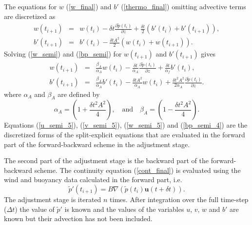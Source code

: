 \documentclass[times]{qjrms4}
\begin{document}
The equations for $w$ (\ref{w_final}) and $b'$ (\ref{thermo_final}) omitting advective terms are 
discretized as
\begin{eqnarray} 
w(t_{i+1}) &=& w(t_i) - \delta t \frac{\partial \tilde{p}(t_i)}{\partial z} + 
\frac {\delta t }{2} \left( b'(t_i) + b'(t_{i+1}) \right),\label{w_semi} \\
b'(t_{i+1}) &=& b'(t_i) - \frac {\delta t A^2 }{2} \left( w(t_i) + w(t_{i+1}) \right).
\label{bp_semi}
\end{eqnarray}
Solving (\ref{w_semi}) and (\ref{bp_semi}) for $w(t_{i+1})$ and $b'(t_{i+1})$ gives
  \begin{eqnarray} 
    w(t_{i+1}) &=& \frac{\beta_A}{\alpha_A} w(t_i) - \frac {\delta t }{\alpha_A} 
    \frac{\partial \tilde{p}(t_i)}{\partial z} + 
      \frac{\delta t }{\alpha_f} b'(t_i), \label{w_semi_5} \\ 
     b'(t_{i+1}) &=& \frac{\beta_A}{\alpha_A} b'(t_i) - \frac{\delta t A^2}{\alpha_A} w(t_i) 
     + \frac {\delta t^2 A^2 }{2 \alpha_A}
     \frac{\partial \tilde{p}(t_i)}{\partial z}.
     \label{bp_semi_4}  
  \end{eqnarray}
where $\alpha_A$ and $\beta_A$ are defined by
\begin{equation} \label{def_alpha_beta_A}
\alpha_A = \left( 1 + \frac{\delta t^2 A^2}{4} \right), \quad \mbox{and} \quad
\beta_A = \left( 1 - \frac{\delta t^2 A^2}{4} \right).
\end{equation}
Equations (\ref{u_semi_5}), (\ref{v_semi_5}), (\ref{w_semi_5}) and (\ref{bp_semi_4}) are 
the discretized forms of the split-explicit equations that are evaluated in the forward part 
of the forward-backward scheme in the adjustment stage. 

The second part of the adjustment stage is the backward part of the forward-backward scheme. 
The continuity equation (\ref{cont_final}) is evaluated using the wind and buoyancy data calculated in
the forward part, i.e.
  \begin{equation}
    \tilde{p}'(t_{i+1}) = B \nabla \left(\tilde{p}(t_i) \mathbf u(t +\delta t) \right).
  \end{equation}
The adjustment stage is iterated $n$ times. After integration over the full time-step ($\Delta t$) 
the value of $\tilde{p}'$ is known and the values of the variables $u$, $v$, $w$ and $b'$ are known
but their advection has not been included.
\end{document}
